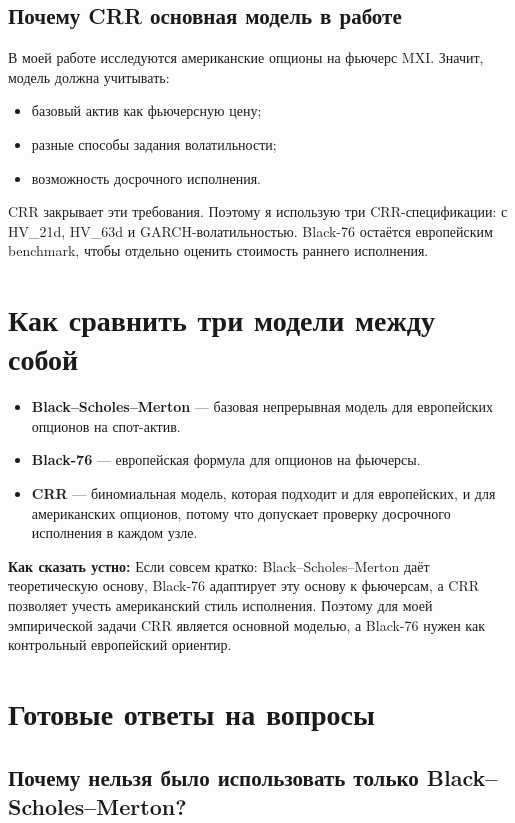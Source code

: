 \documentclass[11pt,a4paper]{article}
\newcommand{\speechbox}[1]{%
  \noindent\colorbox{softblue}{%
    \parbox{\dimexpr\linewidth-2\fboxsep\relax}{\textbf{Как сказать устно:} #1}%
  }\par\vspace{0.2em}
}
\begin{document}
\subsection{Почему CRR основная модель в работе}

В моей работе исследуются американские опционы на фьючерс MXI. Значит, модель должна учитывать:

\begin{itemize}
    \item базовый актив как фьючерсную цену;
    \item разные способы задания волатильности;
    \item возможность досрочного исполнения.
\end{itemize}

CRR закрывает эти требования. Поэтому я использую три CRR-спецификации: с HV\_21d, HV\_63d и GARCH-волатильностью. Black-76 остаётся европейским benchmark, чтобы отдельно оценить стоимость раннего исполнения.

\section{Как сравнить три модели между собой}

\begin{itemize}
    \item \textbf{Black--Scholes--Merton} --- базовая непрерывная модель для европейских опционов на спот-актив.
    \item \textbf{Black-76} --- европейская формула для опционов на фьючерсы.
    \item \textbf{CRR} --- биномиальная модель, которая подходит и для европейских, и для американских опционов, потому что допускает проверку досрочного исполнения в каждом узле.
\end{itemize}

\speechbox{Если совсем кратко: Black--Scholes--Merton даёт теоретическую основу, Black-76 адаптирует эту основу к фьючерсам, а CRR позволяет учесть американский стиль исполнения. Поэтому для моей эмпирической задачи CRR является основной моделью, а Black-76 нужен как контрольный европейский ориентир.}

\section{Готовые ответы на вопросы}

\subsection*{Почему нельзя было использовать только Black--Scholes--Merton?}
\end{document}

